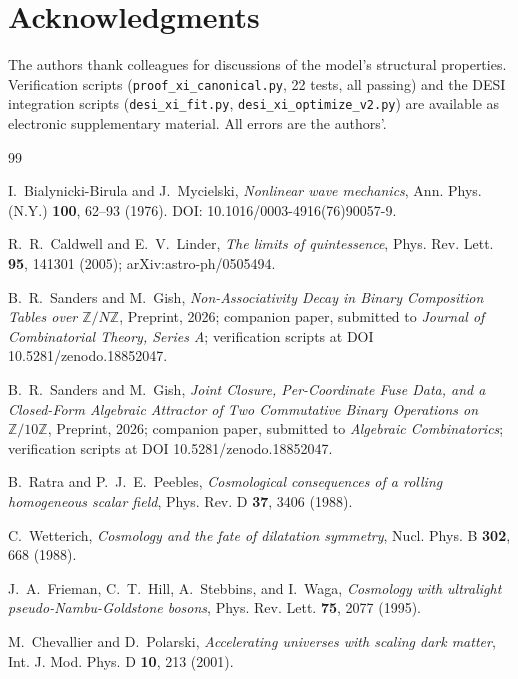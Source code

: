 \documentclass[11pt,reqno]{amsart}
\theoremstyle{plain}
\theoremstyle{definition}
\theoremstyle{remark}
\begin{document}
\section*{Acknowledgments}

The authors thank colleagues for discussions of the model's structural
properties. Verification scripts (\texttt{proof\_xi\_canonical.py}, 22
tests, all passing) and the DESI integration scripts
(\texttt{desi\_xi\_fit.py}, \texttt{desi\_xi\_optimize\_v2.py}) are available
as electronic supplementary material. All errors are the authors'.

\begin{thebibliography}{99}

I.~Bialynicki-Birula and J.~Mycielski,
\emph{Nonlinear wave mechanics},
Ann. Phys. (N.Y.) \textbf{100}, 62--93 (1976).
DOI: 10.1016/0003-4916(76)90057-9.

R.~R.~Caldwell and E.~V.~Linder,
\emph{The limits of quintessence},
Phys. Rev. Lett. \textbf{95}, 141301 (2005); arXiv:astro-ph/0505494.

B.~R.~Sanders and M.~Gish,
\emph{Non-Associativity Decay in Binary Composition Tables over
$\mathbb{Z}/N\mathbb{Z}$},
Preprint, 2026; companion paper, submitted to
\emph{Journal of Combinatorial Theory, Series A};
verification scripts at DOI 10.5281/zenodo.18852047.

B.~R.~Sanders and M.~Gish,
\emph{Joint Closure, Per-Coordinate Fuse Data, and a Closed-Form
Algebraic Attractor of Two Commutative Binary Operations on
$\mathbb{Z}/10\mathbb{Z}$},
Preprint, 2026; companion paper, submitted to
\emph{Algebraic Combinatorics};
verification scripts at DOI 10.5281/zenodo.18852047.

B.~Ratra and P.~J.~E.~Peebles,
\emph{Cosmological consequences of a rolling homogeneous scalar field},
Phys. Rev. D \textbf{37}, 3406 (1988).

C.~Wetterich,
\emph{Cosmology and the fate of dilatation symmetry},
Nucl. Phys. B \textbf{302}, 668 (1988).

J.~A.~Frieman, C.~T.~Hill, A.~Stebbins, and I.~Waga,
\emph{Cosmology with ultralight pseudo-Nambu-Goldstone bosons},
Phys. Rev. Lett. \textbf{75}, 2077 (1995).

M.~Chevallier and D.~Polarski,
\emph{Accelerating universes with scaling dark matter},
Int. J. Mod. Phys. D \textbf{10}, 213 (2001).


\end{thebibliography}
\end{document}
